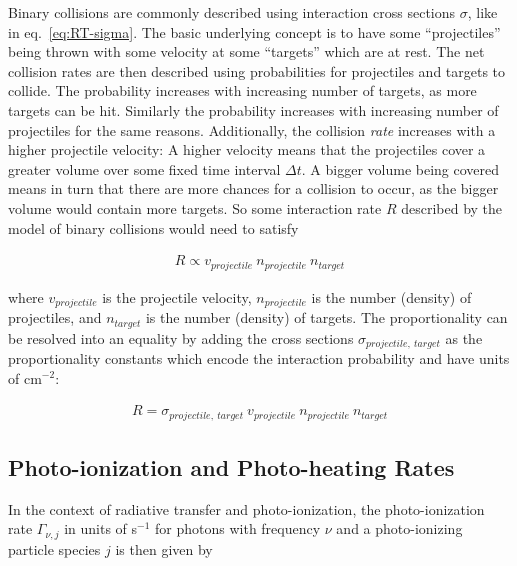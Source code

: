 Binary collisions are commonly described using interaction cross sections $\sigma$, like in
eq.~\ref{eq:RT-sigma}. The basic underlying concept is to have some ``projectiles'' being thrown
with some velocity at some ``targets'' which are at rest. The net collision rates are then
described using probabilities for projectiles and targets to collide. The probability increases
with increasing number of targets, as more targets can be hit. Similarly the probability increases
with increasing number of projectiles for the same reasons. Additionally, the collision \emph{rate}
increases with a higher projectile velocity: A higher velocity means that the projectiles cover a
greater volume over some fixed time interval $\Delta t$. A bigger volume being covered means in turn
that there are more chances for a collision to occur, as the bigger volume would contain more
targets. So some interaction rate $R$ described by the model of binary collisions would need to
satisfy

\begin{align}
    R \propto v_{projectile} \ n_{projectile} \ n_{target}
\end{align}

where $v_{projectile}$ is the projectile velocity, $n_{projectile}$ is the number (density) of
projectiles, and $n_{target}$ is the number (density) of targets. The proportionality can be
resolved into an equality by adding the cross sections $\sigma_{projectile,\ target}$ as the
proportionality constants which encode the interaction probability and have units of cm$^{-2}$:


\begin{align}
    R = \sigma_{projectile,\ target} \ v_{projectile} \ n_{projectile} \ n_{target}
\end{align}









\subsection{Photo-ionization and Photo-heating Rates}


In the context of radiative transfer and photo-ionization, the photo-ionization rate $\Gamma_{\nu,
j}$ in units of s$^{-1}$ for photons with frequency $\nu$ and a photo-ionizing particle species $j$
is then given by


